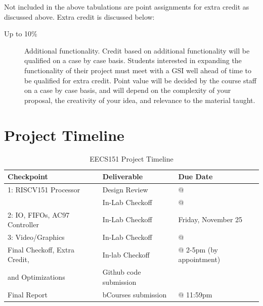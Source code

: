 \documentclass[11pt]{article}
\begin{document}
Not included in the above tabulations are point assignments for extra credit as discussed above. Extra credit is discussed below:

\begin{description}
  \item[Up to 10\%] Additional functionality. Credit based on additional functionality will be qualified on a case by case basis. Students interested in expanding the functionality of their project must meet with a GSI well ahead of time to be qualified for extra credit. Point value will be decided by the course staff on a case by case basis, and will depend on the complexity of your proposal, the creativity of your idea, and relevance to the material taught.
\end{description}

\pagebreak
\section{Project Timeline}

\begin{table}[h!]
	\centering
	\begin{center}
	\begin{tabular}{l l l}
		\toprule
		{Checkpoint} &{Deliverable} & {Due Date} \\
		\midrule
		1: RISCV151 Processor & Design Review &  \blockDiagramDueDate \space @ \dueDateTime\\
		 & In-Lab Checkoff & \baseCPUDueDate \space @ \dueDateTime \\
		\midrule
		2: IO, FIFOs, AC97 Controller & In-Lab Checkoff & Friday, November 25\\
		\midrule
		3: Video/Graphics & In-Lab Checkoff &  \ethernetDueDate \space @ \dueDateTime\\
		\midrule
		Final Checkoff, Extra Credit, &    In-lab Checkoff        & \finalCheckoffDueDate \space @ 2-5pm (by appointment) \\
		and Optimizations             & Github code submission    & \\
		\midrule
		Final Report                  &   bCourses submission     & \finalCheckoffDueDate \space @ 11:59pm\\
		\bottomrule
	\end{tabular}
	\end{center}
    \caption{EECS151 \currentSemester \space Project Timeline}\label{tab:master}
\end{table}
\end{document}
